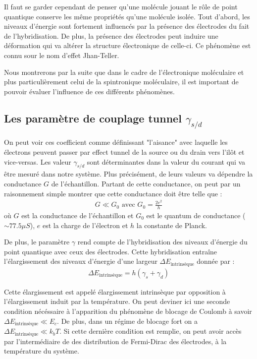 Il faut se garder cependant de penser qu'une molécule jouant le r\^ole de point quantique conserve les m\^eme propriétés qu'une molécule isolée. Tout d'abord, les niveaux d'énergie sont fortement influencés par la présence des électrodes du fait de l'hybridisation. De plus, la présence des électrodes peut induire une déformation qui va altérer la structure électronique de celle-ci. Ce phénomène est connu sour le nom d'effet Jhan-Teller. 

Nous montrerons par la suite que dans le cadre de l'électronique moléculaire et plus particulièrement celui de la spintronique moléculaire, il est important de pouvoir évaluer l'influence de ces différents phénomènes.

\subsection{Les paramètre de couplage tunnel $\gamma_{s/d}$}
On peut voir ces coefficient comme définissant "l'aisance" avec laquelle les électrons peuvent passer par effect tunnel de la source ou du drain vers l'il\^ot et vice-versas. Les valeur $\gamma_{s/d}$ sont déterminantes dans la valeur du courant qui va \^etre mesuré dans notre système. Plus précisément, de leurs valeurs va dépendre la conductance $G$ de l'échantillon. Partant de cette conductance, on peut par un raisonnement simple montrer que cette conductance doit \^etre telle que :
\begin{eqnarray}
G \ll G_0 \text{ avec } G_0 = \frac{2e^2}{h}
\end{eqnarray}
où $G$ est la conductance de l'échantillon et $G_0$ est le quantum de conductance ($\sim 77.5 \mu S$), $e$ est la charge de l'électron et $h$ la constante de Planck.


De plus, le paramètre $\gamma$ rend compte de l'hybridisation des niveaux d'énergie du point quantique avec ceux des électrodes. Cette hybridisation entraîne l'élargissement des niveaux d'énergie d'une largeur $\Delta E_{\text{intrinsèque}}$ donnée par :
\begin{eqnarray}
\Delta E_{\text{intrinsèque}} = h (\gamma_s + \gamma_d)
\end{eqnarray}

Cette élargissement est appelé élargissement intrinsèque par opposition à l'élargissement induit par la température. On peut deviner ici une seconde condition nécéssaire à l'apparition du phénomène de blocage de Coulomb à savoir $\Delta E_{\text{intrinsèque}} \ll E_c$. De plus, dans un régime de blocage fort on a $\Delta E_{\text{intrinsèque}} \ll k_bT$. Si cette dernière condition est remplie, on peut avoir accès par l'intermédiaire de des distribution de Fermi-Dirac des électrodes, à la température du système.





